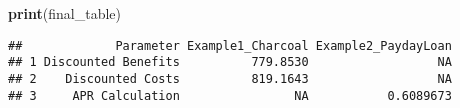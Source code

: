 \documentclass[
]{article}
\newenvironment{Shaded}{\begin{snugshade}}{\end{snugshade}}
\newcommand{\FunctionTok}[1]{\textcolor[rgb]{0.13,0.29,0.53}{\textbf{#1}}}
\newcommand{\NormalTok}[1]{#1}
\begin{document}
\begin{Shaded}
\begin{Highlighting}[]
\FunctionTok{print}\NormalTok{(final\_table)}
\end{Highlighting}
\end{Shaded}

\begin{verbatim}
##             Parameter Example1_Charcoal Example2_PaydayLoan
## 1 Discounted Benefits          779.8530                  NA
## 2    Discounted Costs          819.1643                  NA
## 3     APR Calculation                NA           0.6089673
\end{verbatim}
\end{document}
